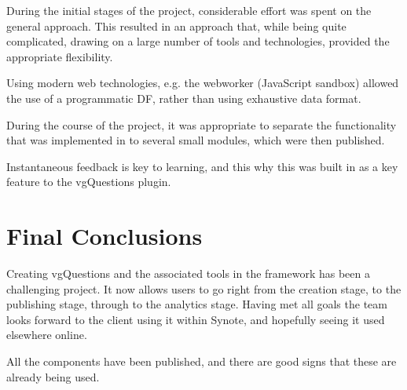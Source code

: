 
During the initial stages of the project, considerable effort was spent on the general approach. This resulted in an approach that, while being quite complicated, drawing on a large number of tools and technologies, provided the appropriate flexibility.

Using modern web technologies, e.g. the \gls{webworker} (JavaScript sandbox) allowed the use of a programmatic \gls{DF}, rather than using exhaustive data format.

During the course of the project, it was appropriate to separate the functionality that was implemented in to several small modules, which were then published.

Instantaneous feedback is key to learning, and this why this was built in as a key feature to the \gls{vgQuestions} plugin.

\section{Final Conclusions}

Creating \gls{vgQuestions} and the associated tools in the framework has been a challenging project. It now allows users to go right from the creation stage, to the publishing stage, through to the analytics stage. Having met all goals the team looks forward to the client using it within Synote, and hopefully seeing it used elsewhere online.

All the components have been published, and there are good signs that these are already being used.


